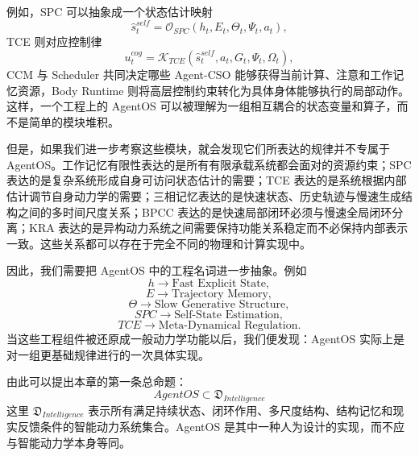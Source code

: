 例如，SPC 可以抽象成一个状态估计映射
\begin{equation}
\widehat{s}^{self}_{t}
=
\mathcal{O}_{SPC}
\left(
h_t,E_t,\Theta_t,\Psi_t,a_t
\right),
\end{equation}
TCE 则对应控制律
\begin{equation}
u^{cog}_{t}
=
\mathcal{K}_{TCE}
\left(
\widehat{s}^{self}_{t},
a_t,
G_t,
\Psi_t,
\Omega_t
\right),
\end{equation}
CCM 与 Scheduler 共同决定哪些 Agent-CSO 能够获得当前计算、注意和工作记忆资源，Body Runtime 则将高层控制约束转化为具体身体能够执行的局部动作。这样，一个工程上的 AgentOS 可以被理解为一组相互耦合的状态变量和算子，而不是简单的模块堆积。

但是，如果我们进一步考察这些模块，就会发现它们所表达的规律并不专属于 AgentOS。工作记忆有限性表达的是所有有限承载系统都会面对的资源约束；SPC 表达的是复杂系统形成自身可访问状态估计的需要；TCE 表达的是系统根据内部估计调节自身动力学的需要；三相记忆表达的是快速状态、历史轨迹与慢速生成结构之间的多时间尺度关系；BPCC 表达的是快速局部闭环必须与慢速全局闭环分离；KRA 表达的是异构动力系统之间需要保持功能关系稳定而不必保持内部表示一致。这些关系都可以存在于完全不同的物理和计算实现中。

因此，我们需要把 AgentOS 中的工程名词进一步抽象。例如
\begin{equation}
h
\longrightarrow
\text{Fast Explicit State},
\end{equation}
\begin{equation}
E
\longrightarrow
\text{Trajectory Memory},
\end{equation}
\begin{equation}
\Theta
\longrightarrow
\text{Slow Generative Structure},
\end{equation}
\begin{equation}
SPC
\longrightarrow
\text{Self-State Estimation},
\end{equation}
\begin{equation}
TCE
\longrightarrow
\text{Meta-Dynamical Regulation}.
\end{equation}
当这些工程组件被还原成一般动力学功能以后，我们便发现：AgentOS 实际上是对一组更基础规律进行的一次具体实现。

由此可以提出本章的第一条总命题：
\begin{equation}
\boxed{
AgentOS
\subset
\mathfrak{D}_{Intelligence}
}
\end{equation}
这里 $\mathfrak{D}_{Intelligence}$ 表示所有满足持续状态、闭环作用、多尺度结构、结构记忆和现实反馈条件的智能动力系统集合。AgentOS 是其中一种人为设计的实现，而不应与智能动力学本身等同。

